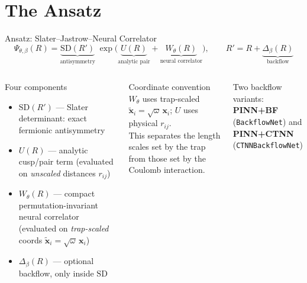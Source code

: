 \documentclass[aspectratio=169,10pt]{beamer}
\begin{document}
\section{The Ansatz}

\begin{frame}{Ansatz: Slater--Jastrow--Neural Correlator}
  \begin{equation*}
    \Psi_{\theta,\beta}(R)
    = \underbrace{\mathrm{SD}(R')}_{\text{antisymmetry}}\;
      \exp\!\bigl(
        \underbrace{U(R)}_{\text{analytic pair}}
        +\underbrace{W_\theta(R)}_{\text{neural correlator}}
      \bigr),
    \qquad
    R' = R + \underbrace{\Delta_\beta(R)}_{\text{backflow}}
  \end{equation*}

  \vspace{0.2cm}
  \begin{columns}[T]
      \begin{block}{Four components}
        \begin{itemize}
          \item $\mathrm{SD}(R')$ — Slater determinant: exact fermionic
                antisymmetry
          \item $U(R)$ — analytic cusp/pair term (evaluated on \emph{unscaled}
                distances $r_{ij}$)
          \item $W_\theta(R)$ — compact permutation-invariant neural correlator
                (evaluated on \emph{trap-scaled} coords $\tilde{\mathbf x}_i
                = \sqrt\omega\,\mathbf x_i$)
          \item $\Delta_\beta(R)$ — optional backflow, only inside $\mathrm{SD}$
        \end{itemize}
      \end{block}
      \begin{alertblock}{Coordinate convention}
        $W_\theta$ uses trap-scaled $\tilde{\mathbf x}_i=\sqrt\omega\,\mathbf x_i$;
        $U$ uses physical $r_{ij}$.\\[5pt]
        This separates the length scales set by the trap from those set by the
        Coulomb interaction.
      \end{alertblock}
      \vspace{0.3cm}
      Two backflow variants:\\
      \textbf{PINN+BF} (\texttt{BackflowNet}) and\\
      \textbf{PINN+CTNN} (\texttt{CTNNBackflowNet})
  \end{columns}
\end{frame}
\end{document}
